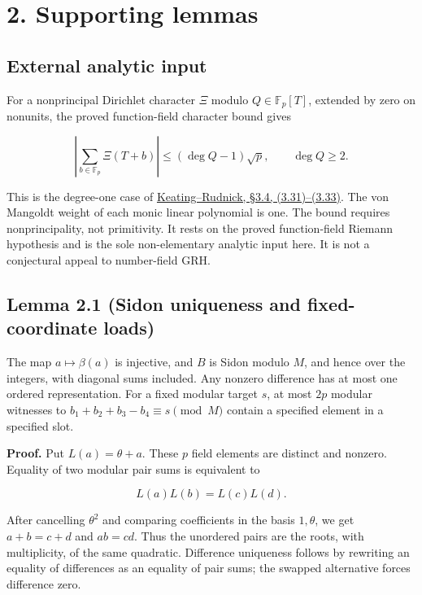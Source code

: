 \documentclass[11pt,a4paper]{article}
\begin{document}
\section{2. Supporting lemmas}\label{supporting-lemmas}

\subsection{External analytic input}\label{external-analytic-input}

For a nonprincipal Dirichlet character \(\Xi\) modulo \(Q\in\mathbb F_p[T]\), extended by zero on nonunits, the proved function-field character bound gives

\[\left|\sum_{b\in\mathbb F_p}\Xi(T+b)\right|
\le(\deg Q-1)\sqrt p,\qquad \deg Q\ge2.
\tag{9}\]

This is the degree-one case of \href{https://arxiv.org/pdf/1204.0708v3}{Keating--Rudnick, §3.4, (3.31)--(3.33)}. The von Mangoldt weight of each monic linear polynomial is one. The bound requires nonprincipality, not primitivity. It rests on the proved function-field Riemann hypothesis and is the sole non-elementary analytic input here. It is not a conjectural appeal to number-field GRH.

\subsection{Lemma 2.1 (Sidon uniqueness and fixed-coordinate loads)}\label{lemma-2.1-sidon-uniqueness-and-fixed-coordinate-loads}

The map \(a\mapsto\beta(a)\) is injective, and \(B\) is Sidon modulo \(M\), and hence over the integers, with diagonal sums included. Any nonzero difference has at most one ordered representation. For a fixed modular target \(s\), at most \(2p\) modular witnesses to \(b_1+b_2+b_3-b_4\equiv s\pmod M\) contain a specified element in a specified slot.

\textbf{Proof.} Put \(L(a)=\theta+a\). These \(p\) field elements are distinct and nonzero. Equality of two modular pair sums is equivalent to

\[L(a)L(b)=L(c)L(d).\]

After cancelling \(\theta^2\) and comparing coefficients in the basis \(1,\theta\), we get \(a+b=c+d\) and \(ab=cd\). Thus the unordered pairs are the roots, with multiplicity, of the same quadratic. Difference uniqueness follows by rewriting an equality of differences as an equality of pair sums; the swapped alternative forces difference zero.
\end{document}
